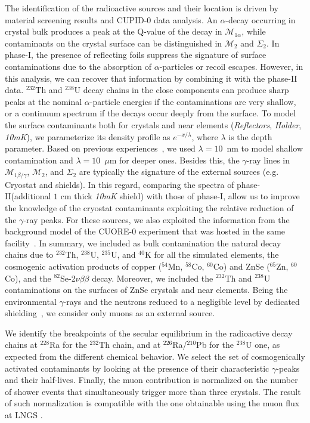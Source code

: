 \documentclass[%
reprint,
superscriptaddress,
altaffilletter,
showpacs,
showkeys,
amsmath, amssymb, aps,prl, floatfix
]{revtex4-1}
\newcommand{\se}{$^{82}$Se\xspace}
\newcommand{\THO}{$^{232}\mathrm{Th}$\xspace}
\newcommand{\UR}{$^{238}\mathrm{U}$\xspace}
\newcommand{\URA}{$^{235}\mathrm{U}$\xspace}
\newcommand{\K}{$^{40}\mathrm{K}$\xspace}
\newcommand{\vv}{2$\nu\beta\beta$\xspace}
\newcommand{\mspeconea}{$\mathcal{M}_{1\alpha}$\xspace}
\newcommand{\mspeconeb}{$\mathcal{M}_{1\beta/\gamma}$\xspace}
\newcommand{\mspectwo}{$\mathcal{M}_2$\xspace}
\newcommand{\summspectwo}{$\Sigma_2$\xspace}
\newcommand{\phone}{phase-I\xspace}
\newcommand{\phtwo}{phase-II\xspace}
\begin{document}
The identification of the radioactive sources and their location is driven by material screening results and CUPID-0 data analysis. An $\alpha$-decay occurring in crystal bulk produces a peak at the Q-value of the decay in \mspeconea, while contaminants on the crystal surface can be distinguished in \mspectwo and \summspectwo. In \phone, the presence of reflecting foils 
suppress the signature of surface contaminations due to the absorption of $\alpha$-particles or recoil escapes. However, in this analysis, we can recover that information by combining it with the \phtwo data. \THO and \UR decay chains in the close components can produce sharp peaks at the nominal $\alpha$-particle energies if the contaminations are very shallow, or a continuum spectrum if the decays occur deeply from the surface.
To model the surface contaminants both for crystals and near elements (\textit{Reflectors}, \textit{Holder}, \textit{10mK}), we parameterize its density profile as $e^{-x/\lambda}$, where $\lambda$ is the depth parameter. Based on previous experiences~\cite{Azzolini:2019nmi}, we used $\lambda = 10$~nm to model shallow contamination and $\lambda = 10$~$\mu$m for deeper ones.
Besides this, the $\gamma$-ray lines in \mspeconeb, \mspectwo, and \summspectwo are typically the signature of the external sources (e.g. Cryostat and shields). In this regard, comparing the spectra of \phtwo (additional $1$ cm thick \textit{10mK} shield) with those of \phone, allow us to improve the knowledge of the cryostat contaminants exploiting the relative reduction of the $\gamma$-ray peaks.
For these sources, we also exploited the information from the background model of the CUORE-0 experiment that was hosted in the same facility~\cite{Alduino:2016vtd,Azzolini:2019nmi}.
In summary, we included as bulk contamination the natural decay chains due to \THO, \UR, \URA, and \K for all the simulated elements, the cosmogenic activation products of copper ($^{54}$Mn, $^{58}$Co, $^{60}$Co) and ZnSe ($^{65}$Zn, $^{60}$Co), and the \se-\vv decay. 
Moreover, we included the \THO and \UR contaminations on the surfaces of ZnSe crystals and near elements. Being the environmental $\gamma$-rays and the neutrons reduced to a negligible level by dedicated shielding~\cite{Alduino:2016vtd}, we consider only muons as an external source.

We identify the breakpoints of the secular equilibrium in the radioactive decay chains at $^{228}$Ra for the \THO chain, and at $^{226}$Ra/$^{210}$Pb for the \UR one, as expected from the different chemical behavior.
We select the set of cosmogenically activated contaminants by looking at the presence of their characteristic $\gamma$-peaks and their half-lives. 
Finally, the muon contribution is normalized on the number of shower events that simultaneously trigger more than three crystals. The result of such normalization is compatible with the one obtainable using the muon flux at LNGS \cite{Ambrosio:1995cx}.
\end{document}
